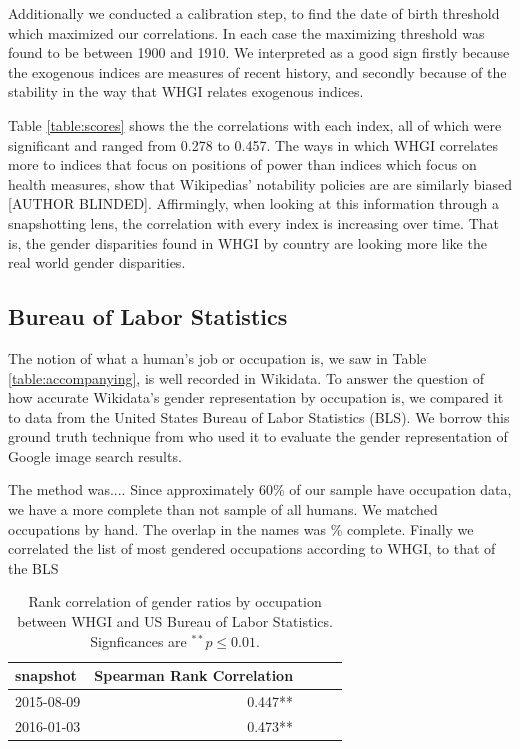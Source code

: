 \documentclass[letterpaper]{article}
\begin{document}
Additionally we conducted a calibration step, to find the date of birth threshold which maximized our correlations. In each case the maximizing threshold was found to be between 1900 and 1910. We interpreted as a good sign firstly because the exogenous indices are measures of recent history, and secondly because of the stability in the way that WHGI relates exogenous indices.

Table \ref{table:scores} shows the the correlations with each index, all of which were significant and ranged from 0.278 to 0.457. The ways in which WHGI correlates more to indices that focus on positions of power than indices which focus on health measures, show that Wikipedias' notability policies are are similarly biased [AUTHOR BLINDED].  Affirmingly, when looking at this information through a snapshotting lens, the correlation with every index is increasing over time. That is, the gender disparities found in WHGI by country are looking more like the real world gender disparities. 


\subsection{Bureau of Labor Statistics}
The notion of what a human's job or occupation is, we saw in Table \ref{table:accompanying}, is well recorded in Wikidata. To answer the question of how accurate Wikidata's gender representation by occupation is, we compared it to data from the United States Bureau of Labor Statistics (BLS). We borrow this ground truth technique from \cite{kay_unequal_2015} who used it to evaluate the gender representation of Google image search results.

The method was.... Since approximately 60\% of our sample have occupation data, we have a more complete than not sample of all humans. We matched occupations by hand. The overlap in the names was \% complete. Finally we correlated the list of most gendered occupations according to WHGI, to that of the BLS

\begin{table}
\caption{Rank correlation of gender ratios by occupation between WHGI and US
Bureau of Labor Statistics. Signficances are $ ^{**}p\leq 0.01$.}
\label{table:bls}
\begin{tabular}{lrrrr}
\toprule
snapshot &  Spearman Rank Correlation \\
\midrule
2015-08-09 & 0.447**  \\
2016-01-03 & 0.473**  \\
\bottomrule
\end{tabular}
\end{table}
\end{document}
